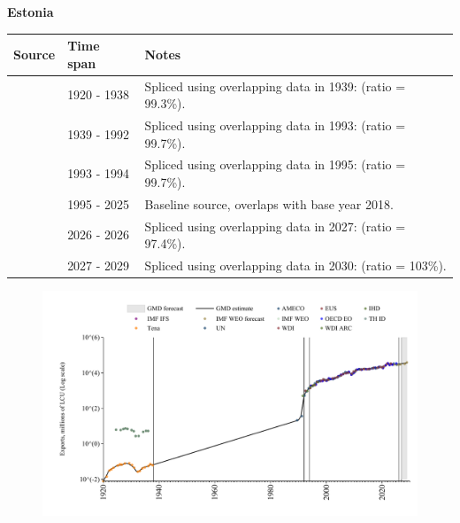 \documentclass[12pt,a4paper,landscape]{article}
\begin{document}
\begin{adjustbox}{max totalsize={\paperwidth}{\paperheight},center}
\begin{minipage}[t][\textheight][t]{\textwidth}
\vspace*{0.5cm}
{}
\begin{center}
{\Large\bfseries Estonia}
\end{center}
\vspace{0.5cm}
\begin{table}[H]
\centering
\small
\begin{tabular}{|l|l|l|}
\hline
\textbf{Source} & \textbf{Time span} & \textbf{Notes} \\
\hline
\rowcolor{white}\cite{Tena}& 1920 - 1938 &Spliced using overlapping data in 1939: (ratio = 99.3\%).\\
\rowcolor{lightgray}\cite{UN}& 1939 - 1992 &Spliced using overlapping data in 1993: (ratio = 99.7\%).\\
\rowcolor{white}\cite{AMECO}& 1993 - 1994 &Spliced using overlapping data in 1995: (ratio = 99.7\%).\\
\rowcolor{lightgray}\cite{OECD_EO}& 1995 - 2025 &Baseline source, overlaps with base year 2018.\\
\rowcolor{white}\cite{AMECO}& 2026 - 2026 &Spliced using overlapping data in 2027: (ratio = 97.4\%).\\
\rowcolor{lightgray}\cite{IMF_WEO_forecast}& 2027 - 2029 &Spliced using overlapping data in 2030: (ratio = 103\%).\\
\hline
\end{tabular}
\end{table}
\begin{figure}[H]
\centering
\includegraphics[width=\textwidth,height=0.6\textheight,keepaspectratio]{graphs/EST_exports.pdf}
\end{figure}
\end{minipage}
\end{adjustbox}
\end{document}
